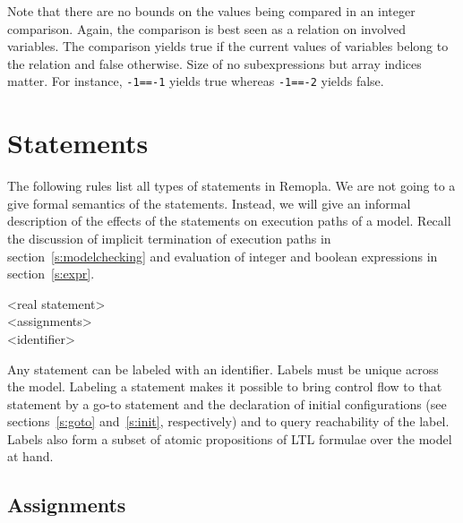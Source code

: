 \documentclass[a4paper,11pt,titlepage,english]{article}
\begin{document}
Note that there are no bounds on the values being compared in an integer
comparison.  Again, the comparison is best seen as a relation on involved
variables.  The comparison yields true if the current values of variables
belong to the relation and false otherwise. Size of no subexpressions but
array indices matter. For instance, \verb|-1==-1| yields true whereas
\verb|-1==-2| yields false.


\section{Statements\label{s:statements}}

The following rules list all types of statements in Remopla.  We are not
going to a give formal semantics of the statements. Instead, we will give
an informal description of the effects of the statements
on execution paths of a model. Recall the discussion of implicit
termination of execution paths in section~\ref{s:modelchecking} and
evaluation of integer and boolean expressions in section~\ref{s:expr}.

\begin{bnfgrammar}
[statement] \is {} <real statement> \\
[real statement] \is <assignments>
    \\
[label] \is <identifier> \\
\end{bnfgrammar}

Any statement can be labeled with an identifier. Labels must be unique
across the model. Labeling a statement makes it possible to bring control
flow to that statement by a go-to statement and the declaration of initial
configurations (see sections~\ref{s:goto} and~\ref{s:init}, respectively)
and to query reachability of the label. Labels also form a subset of atomic
propositions of LTL formulae over the model at hand.


\subsection{Assignments\label{s:assignments}}
\end{document}
